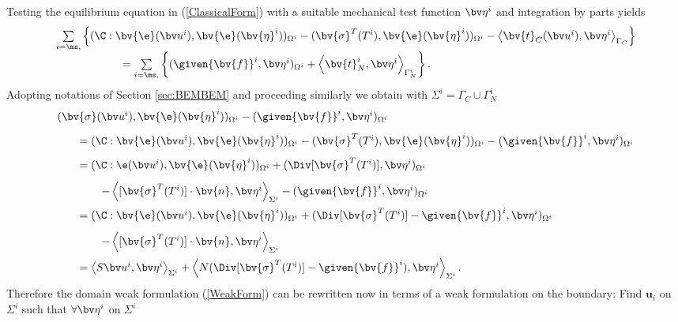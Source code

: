 Testing the equilibrium equation in (\ref{ClassicalForm}) with a suitable mechanical test function $\bv \eta^i$ \cite{WrMi94}  and integration by parts yields
\begin{equation}\label{WeakForm}
\begin{array}{l}
\sum \limits_{i=\ms,\sl} \left\lbrace (\C : \bv{\e}(\bv u^i), \bv{\e}(\bv{\eta}^i))_{\Omega^i}
- (\bv{\sigma}^T(T^i), \bv{\e}(\bv{\eta}^i))_{\Omega^i}
- \left\langle \bv{t}_C(\bv u^i), \bv \eta^i \right\rangle_{\Gamma_C} \right\rbrace \\
\qquad\qquad\qquad = \sum \limits_{i=\ms,\sl} \left\lbrace (\given{\bv{f}}^i, \bv \eta^i)_{\Omega^i}
+ \left\langle \bv{t}^i_N, \bv \eta^i \right\rangle_{\Gamma_N^i} \right\rbrace .
\end{array}
\end{equation}
Adopting notations of Section \ref{sec:BEMBEM} and proceeding similarly we obtain with $\Sigma^i=\Gamma_C\cup\Gamma_N^i$
\begin{equation*}\allowbreak
\begin{array}{l}
(\bv{\sigma}(\bv u^i),\bv{\e}(\bv{\eta}^i))_{\Omega^i} 
- (\given{\bv{f}}^i, \bv \eta^i)_{\Omega^i}\\[2ex]
\qquad = ( \C : \bv{\e}(\bv u^i),\bv{\e}(\bv{\eta}^i))_{\Omega^i} 
- (\bv{\sigma}^T(T^i),\bv{\e}(\bv{\eta}^i))_{\Omega^i} 
- (\given{\bv{f}}^i, \bv \eta^i)_{\Omega^i}\\[2ex]
\qquad = ( \C : \e(\bv u^i),\bv{\e}(\bv{\eta}^i))_{\Omega^i} 
+ (\Div [\bv{\sigma}^T(T^i)], \bv \eta^i)_{\Omega^i} \\[2ex]
\qquad \qquad - \left\langle [\bv{\sigma}^T(T^i)] \cdot \bv{n}, \bv \eta^i\right\rangle_{\Sigma^i} 
- (\given{\bv{f}}^i, \bv \eta^i)_{\Omega^i}\\[2ex]
\qquad = ( \C : \bv{\e}(\bv u^i),\bv{\e}(\bv{\eta}^i))_{\Omega^i} 
+ (\Div [\bv{\sigma}^T(T^i)] - \given{\bv{f}}^i,\bv \eta^i)_{\Omega^i} \\[2ex]
\qquad \qquad - \left\langle [\bv{\sigma}^T(T^i)] \cdot \bv{n}, \bv \eta^i\right\rangle_{\Sigma^i} \\[2ex]
\qquad = \left\langle S \bv u^i, \bv \eta^i \right\rangle_{\Sigma^i} 
+ \left\langle N (\Div [\bv{\sigma}^T(T^i)] - \given{\bv{f}}^i) , \bv \eta^i \right\rangle_{\Sigma^i}.
\end{array}
\end{equation*}
Therefore the domain weak formulation (\ref{WeakForm}) can be rewritten now in terms of a weak formulation on the boundary: Find $\mathbf{u}_i$ on $\Sigma^i$ such that $\forall \bv \eta^i$ on $\Sigma^i$
